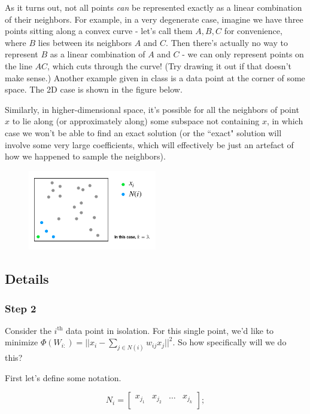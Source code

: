 As it turns out, not all points \textit{can} be represented exactly as a linear combination of their neighbors. For example, in a very degenerate case, imagine we have three points sitting along a convex curve - let's call them $A, B, C$ for convenience, where $B$ lies between its neighbors $A$ and $C$. Then there's actually no way to represent $B$ as a linear combination of $A$ and $C$ - we can only represent points on the line $AC$, which cuts through the curve! (Try drawing it out if that doesn't make sense.) Another example given in class is a data point at the corner of some space. The 2D case is shown in the figure below.

Similarly, in higher-dimensional space, it's possible for all the neighbors of point $x$ to lie along (or approximately along) some subspace not containing $x$, in which case we won't be able to find an exact solution (or the ``exact" solution will involve some very large coefficients, which will effectively be just an artefact of how we happened to sample the neighbors).

\begin{figure}[H]
\centering
\includegraphics[width=0.5\textwidth]{chapter_7/files/no_linear_comb_case.png}
\end{figure}

\subsection*{Details}
\subsubsection*{Step 2}
Consider the $i^\text{th}$ data point in isolation. For this single point, we'd like to minimize $\Phi (W_{i:})=||x_i-\sum_{j\in N(i)} w_{ij} x_j||^2$. So how specifically will we do this?

First let's define some notation.

\[N_i=
\begin{bmatrix}
    x_{j_1} & x_{j_2} & \dots & x_{j_k} \\
\end{bmatrix};
\]

